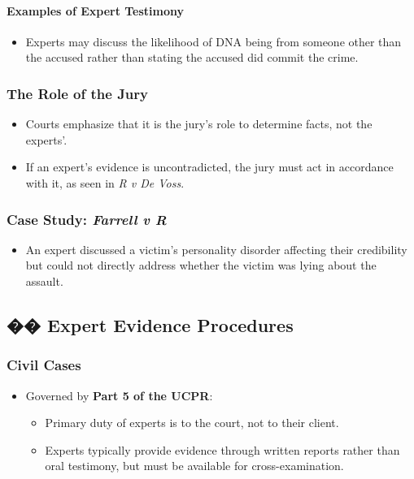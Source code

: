 \paragraph{Examples of Expert
Testimony}\label{examples-of-expert-testimony}

\begin{itemize}
\tightlist
\item
  Experts may discuss the likelihood of DNA being from someone other
  than the accused rather than stating the accused did commit the crime.
\end{itemize}

\subsubsection{The Role of the Jury}\label{the-role-of-the-jury}

\begin{itemize}
\item
  Courts emphasize that it is the jury's role to determine facts, not
  the experts'.
\item
  If an expert's evidence is uncontradicted, the jury must act in
  accordance with it, as seen in \emph{R v De Voss}.
\end{itemize}

\subsubsection{\texorpdfstring{Case Study: \emph{Farrell v
R}}{Case Study: Farrell v R}}\label{case-study-farrell-v-r}

\begin{itemize}
\tightlist
\item
  An expert discussed a victim's personality disorder affecting their
  credibility but could not directly address whether the victim was
  lying about the assault.
\end{itemize}

\subsection{��️ Expert Evidence
Procedures}\label{expert-evidence-procedures}

\subsubsection{Civil Cases}\label{civil-cases}

\begin{itemize}
\tightlist
\item
  Governed by \textbf{Part 5 of the UCPR}:

  \begin{itemize}
  \tightlist
  \item
    Primary duty of experts is to the court, not to their client.
  \item
    Experts typically provide evidence through written reports rather
    than oral testimony, but must be available for cross-examination.
  \end{itemize}
\end{itemize}

